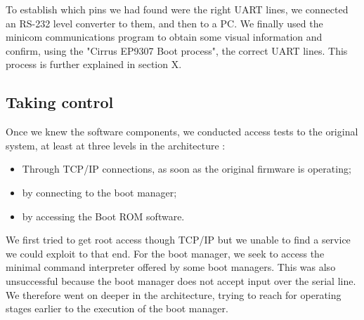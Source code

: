 \documentclass[conference]{IEEEtran}
\newcommand{\nota}[1]{}
\begin{document}
To establish which pins we had found were the right UART lines, we
connected an RS-232 level converter to them, and then to a PC.
We finally used the minicom communications program to obtain some
visual information and confirm, using the "Cirrus EP9307 Boot process", the correct UART lines. 
This process is further explained in section X.



\subsection{Taking control}
\nota {
Conociendo los componentes de software, se realizaron pruebas
de acceso al sistema original en al menos tres niveles de la arquitectura:
\begin{itemize}
\item A través de conexiones TCP/IP una vez que el firmware original está en ejecución,
\item a través del conexiones al gestor de arranque,
\item a través de accesos al software del Boot ROM.
\end{itemize}
}

Once we knew the software components, we conducted access tests to the original system, at least at three levels in the architecture :
\begin{itemize}
\item Through TCP/IP connections, as soon as the original firmware is operating;
\item by connecting to the boot manager;
\item by accessing the Boot ROM software.
\end{itemize}

\nota { En los primeros dos casos no se tuvieron resultados promisorios.
La tarea en estos puntos es obtener acceso como administrador del sistema
Linux cerrado. O en el caso del gestor de arranque, se busca
el acceso al interprete de comandos mínimo, que algunos gestores proveen.
Por lo que se continuó a mas bajo nivel, para obtener acceso a niveles
anteriores a la ejecución del gestor de arranque.}

We first tried to get root access though TCP/IP but we unable
to find a service we could exploit to that end.
For the boot manager, we seek to access the minimal command
interpreter offered by some boot managers.
This was also unsuccessful because the boot manager does not accept 
input over the serial line.
We therefore went on deeper in the architecture, trying to reach for operating
stages earlier to the execution of the boot manager.
\end{document}
